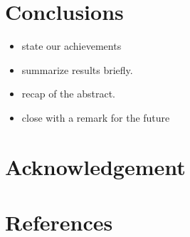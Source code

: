 \documentclass[10pt,twocolumn,letterpaper]{article}
\begin{document}
\section{Conclusions}

\begin{itemize}
    \item state our achievements
    \item summarize results briefly.
    \item recap of the abstract.
    \item close with a remark for the future
\end{itemize}


\section*{Acknowledgement}

\section*{References}
\end{document}

